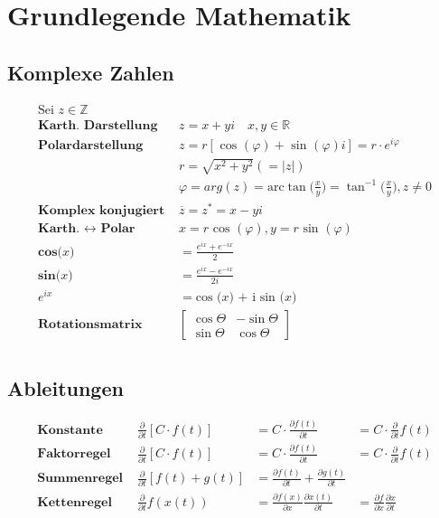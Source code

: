 \documentclass[8pt]{article}
\begin{document}
	\section{Grundlegende Mathematik}
		\subsection{Komplexe Zahlen}
			\begin{align*}
				\text{Sei }z \in \mathbb{Z} \text{ }& \\
				\textbf{Karth. Darstellung } 			& z = x + yi \quad x, y \in \mathbb{R} \\
				\textbf{Polardarstellung } 				& z = r [ \text{ cos }(\varphi) + \text{ sin }(\varphi)i ] = r \cdot e^{i \varphi} \\
														& r = \sqrt{x^2 + y^2} (= |z|) \\
														& \varphi = arg(z) = \text{arc}\tan \Big(\frac{x}{y}\Big) = \tan^{-1} \Big(\frac{x}{y}\Big), z \neq 0 \\
				\textbf{Komplex konjugiert } 			& \overline{z} = z^{*} = x - yi \\
				\textbf{Karth. $\leftrightarrow$ Polar }& x = r \text{ cos }(\varphi), y = r \text{ sin }(\varphi) \\
				\textbf{cos($x$) } & = \frac{e^{i x} + e^{-i x}}{2}\\
				\textbf{sin($x$) } & = \frac{e^{i x} - e^{-i x}}{2i}\\
				\textbf{$e^{ix}$ } & = \text{cos ($x$) + i sin ($x$)}\\
				\textbf{Rotationsmatrix } & \begin{bmatrix}\cos \Theta & -\sin \Theta \\ \sin \Theta & \cos \Theta \end{bmatrix}\\
			\end{align*}
		\subsection{Ableitungen}
			\begin{align*}
				\textbf{Konstante } 	& \frac{\partial}{\partial t} [C \cdot f(t)] & = C \cdot \frac{\partial f(t)}{\partial t} & = C \cdot \frac{\partial}{\partial t} f(t)\\
				\textbf{Faktorregel } 	& \frac{\partial}{\partial t} [C \cdot f(t)] & = C \cdot \frac{\partial f(t)}{\partial t} & = C \cdot \frac{\partial}{\partial t} f(t)\\
				\textbf{Summenregel } 	& \frac{\partial}{\partial t} [f(t) + g(t)] & = \frac{\partial f(t)}{\partial t} + \frac{\partial g(t)}{\partial t} & \\
				\textbf{Kettenregel } 	& \frac{\partial}{\partial t} f(x(t)) & = \frac{\partial f(x)}{\partial x} \frac{\partial x(t)}{\partial t} & = \frac{\partial f}{\partial x}\frac{\partial x}{\partial t}\\
			\end{align*}
\end{document}
